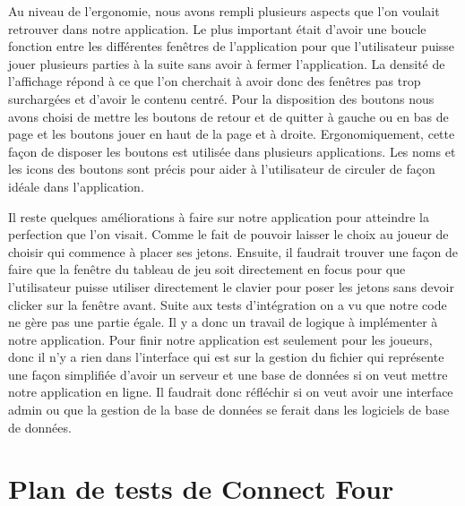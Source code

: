 Au niveau de l'ergonomie, nous avons rempli plusieurs aspects que l'on voulait retrouver dans notre application.
Le plus important était d'avoir une boucle fonction entre les différentes fenêtres de l'application pour que l'utilisateur puisse jouer plusieurs parties à la suite sans avoir à fermer l'application.
La densité de l'affichage répond à ce que l'on cherchait à avoir donc des fenêtres pas trop surchargées et d'avoir le contenu centré.
Pour la disposition des boutons nous avons choisi de mettre les boutons de retour et de quitter à gauche ou en bas de page et les boutons jouer en haut de la page et à droite.
Ergonomiquement, cette façon de disposer les boutons est utilisée dans plusieurs applications.
Les noms et les icons des boutons sont précis pour aider à l'utilisateur de circuler de façon idéale dans l'application.

Il reste quelques améliorations à faire sur notre application pour atteindre la perfection que l'on visait.
Comme le fait de pouvoir laisser le choix au joueur de choisir qui commence à placer ses jetons.
Ensuite, il faudrait trouver une façon de faire que la fenêtre du tableau de jeu soit directement en focus pour que l'utilisateur puisse utiliser directement le clavier pour poser les jetons sans devoir clicker sur la fenêtre avant.
Suite aux tests d'intégration on a vu que notre code ne gère pas une partie égale.
Il y a donc un travail de logique à implémenter à notre application.
Pour finir notre application est seulement pour les joueurs, donc il n'y a rien dans l'interface qui est sur la gestion du fichier qui représente une façon simplifiée d'avoir un serveur et une base de données si on veut mettre notre application en ligne.
Il faudrait donc réfléchir si on veut avoir une interface admin ou que la gestion de la base de données se ferait dans les logiciels de base de données.

\section{Plan de tests de Connect Four}

